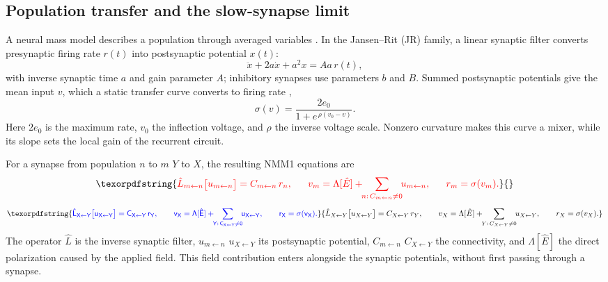 \documentclass[11pt,a4paper]{article}
\newcommand{\Sig}{\sigma}
\providecommand{\DIFaddtex}[1]{{\protect\color{blue} \sf #1}} %
\providecommand{\DIFdeltex}[1]{{\protect\color{red} \scriptsize #1}} %
\providecommand{\DIFaddbegin}{} %
\providecommand{\DIFaddend}{} %
\providecommand{\DIFdelbegin}{} %
\providecommand{\DIFdelend}{} %
\providecommand{\DIFadd}[1]{\texorpdfstring{\DIFaddtex{#1}}{#1}} %
\providecommand{\DIFdel}[1]{\texorpdfstring{\DIFdeltex{#1}}{}} %
\begin{document}
\subsection{Population transfer and the slow-synapse limit}\label{sec:nmm}
A neural mass model describes a population through averaged variables
\cite{ruffini2025rosetta,jansen1995}. In the Jansen--Rit (JR) family, a linear synaptic
filter converts presynaptic firing rate $r(t)$ into postsynaptic potential $x(t)$:
\[
\ddot x+2a\dot x+a^2x=Aa\,r(t),
\]
with inverse synaptic time $a$ and gain parameter $A$; inhibitory synapses use
parameters $b$ and $B$. Summed postsynaptic potentials give the mean input $v$, which
a static transfer curve converts to firing rate \cite{wilsoncowan1972},
\begin{equation}
\Sig(v)=\frac{2e_0}{1+e^{\,\rho(v_0-v)}} .
\label{eq:sigmoid}
\end{equation}
Here $2e_0$ is the maximum rate, $v_0$ the inflection voltage, and $\rho$ the inverse
voltage scale. Nonzero curvature makes this curve a mixer, while its slope sets
the local gain of the recurrent circuit.

For a synapse from population \DIFdelbegin \DIFdel{$n$ to $m$}\DIFdelend \DIFaddbegin \DIFadd{$Y$ to $X$}\DIFaddend , the resulting NMM1 equations are
\cite{ruffini2025rosetta}
\DIFdelbegin \begin{displaymath}
\DIFdel{\hat L_{m\leftarrow n}\big[u_{m\leftarrow n}\big]=C_{m\leftarrow n}\,r_n,\qquad
v_m=\Lambda[\hat E]+\!\!\sum_{n:\,C_{m\leftarrow n}\neq0}\!\!u_{m\leftarrow n},\qquad
r_m=\Sig(v_m).
}\end{displaymath}%
\DIFdelend \DIFaddbegin \begin{equation}
\DIFadd{\hat L_{X\leftarrow Y}\big[u_{X\leftarrow Y}\big]=C_{X\leftarrow Y}\,r_Y,\qquad
v_X=\Lambda[\hat E]+\!\!\sum_{Y:\,C_{X\leftarrow Y}\neq0}\!\!u_{X\leftarrow Y},\qquad
r_X=\Sig(v_X).
\label{eq:nmm1}
}\end{equation}\DIFaddend 
The operator $\hat L$ is the inverse synaptic filter, \DIFdelbegin \DIFdel{$u_{m\leftarrow n}$ }\DIFdelend \DIFaddbegin \DIFadd{$u_{X\leftarrow Y}$ }\DIFaddend its
postsynaptic potential, \DIFdelbegin \DIFdel{$C_{m\leftarrow n}$ }\DIFdelend \DIFaddbegin \DIFadd{$C_{X\leftarrow Y}$ }\DIFaddend the connectivity, and $\Lambda[\hat E]$
the direct polarization caused by the applied field. This field contribution enters
alongside the synaptic potentials, without first passing through a synapse.
\end{document}
